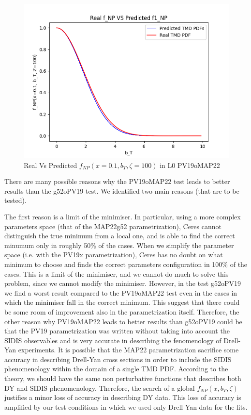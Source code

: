 \documentclass[12pt]{report}
\begin{document}
\begin{figure}[!h]
    \centering
    \includegraphics[scale=0.8]{Images/L0_tests/real_vs_predictions0.00015_Q_10.png}
    \caption{Real Vs Predicted $f_{NP}(x=0.1, b_T, \zeta=100)$ in L0 PV19oMAP22}
    \label{fig:MSE_PV10oMAP22}
\end{figure}

There are many possible reasons why the PV19oMAP22 test leads to better results than the g52oPV19 test. We identified two main reasons (that are to be tested).

The first reason is a limit of the minimiser. In particular, using a more complex parameters space (that of the MAP22g52 parametrization), Ceres cannot distinguish the true minimum from a local one, and is able to find the correct minumum only in roughly 50\% of the cases. When we simplify the parameter space (i.e. with the PV19x parametrization), Ceres has no doubt on what minimum to choose and finds the correct parameters configuration in 100\% of the cases. This is a limit of the minimiser, and we cannot do much to solve this problem, since we cannot modify the minimiser. However, in the test g52oPV19 we find a worst result compared to the PV19oMAP22 test even in the cases in which the minimiser fall in the correct minimum. This suggest that there could be some room of improvement also in the parametrization itself. Therefore, the other reason why PV19oMAP22 leads to better results than g52oPV19 could be that the PV19 parametrization was written without taking into account the SIDIS observables and is very accurate in describing the fenomenology of Drell-Yan experiments. It is possible that the MAP22 parametrization sacrifice some accuracy in describing Drell-Yan cross sections in order to include the SIDIS phenomenology within the domain of a single TMD PDF. According to the theory, we should have the same non perturbative functions that describes both DY and SIDIS phenomenology. Therefore, the search of a global $f_{NP}(x, b_T, \zeta)$ justifies a minor loss of accuracy in describing DY data. This loss of accuracy is amplified by our test conditions in which we used only Drell Yan data for the fits. \\
\end{document}
